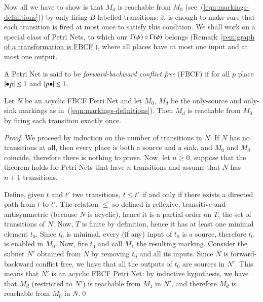 Now all we have to show is that $M_d$ is reachable from $M_0$ (see~(\ref{eqn:markings-definitions})) by only firing $B$-labelled transitions: it is enough to make sure that each transition is fired at most once to satisfy this condition. We shall work on a special class of Petri Nets, to which our $\graph\psi \circ \graph\phi$ belongs (Remark~\ref{rem:graph of a transformation is FBCF}), where all places have at most one input and at most one output.

\begin{definition}\label{def:FBCF petri net}
	A Petri Net is said to be \emph{forward-backward conflict free} (FBCF) if for all $p$ place $\length{\inp p} \le 1$ and $\length{\out p} \le 1$.
\end{definition}

\begin{theorem}\label{thm:acyclic-implies-reachable}
	Let $N$ be an acyclic FBCF Petri Net and let $M_0$, $M_d$ be the only-source and only-sink markings as in~(\ref{eqn:markings-definitions}). Then $M_d$ is reachable from $M_0$ by firing each transition exactly once.
\end{theorem}
\begin{proof}
	We proceed by induction on the number of transitions in $N$. If $N$ has no transitions at all, then every place is both a source and a sink, and $M_0$ and $M_d$ coincide, therefore there is nothing to prove. Now, let $n \ge 0$, suppose that the theorem holds for Petri Nets that have $n$ transitions and assume that $N$ has $n+1$ transitions.
	
	Define, given $t$ and $t'$ two transitions, $t \le t'$ if and only if there exists a directed path from $t$ to $t'$. The relation $\le$ so defined is reflexive, transitive and antisymmetric (because $N$ is acyclic), hence it is a partial order on $T$, the set of transitions of $N$. Now, $T$ is finite by definition, hence it has at least one minimal element $t_0$. Since $t_0$ is minimal, every (if any) input of $t_0$ is a source, therefore $t_0$ is enabled in $M_0$. Now, fire $t_0$ and call $M_1$ the resulting marking. Consider the subnet $N'$ obtained from $N$ by removing $t_0$ and all its inputs. Since $N$ is forward-backward conflict free, we have that all the outputs of $t_0$ are sources in $N'$. This means that $N'$ is an acyclic FBCF Petri Net: by inductive hypothesis, we have that $M_d$ (restricted to $N'$) is reachable from $M_1$ in $N'$, and therefore $M_d$ is reachable from $M_0$ in $N$.\qed
\end{proof}

